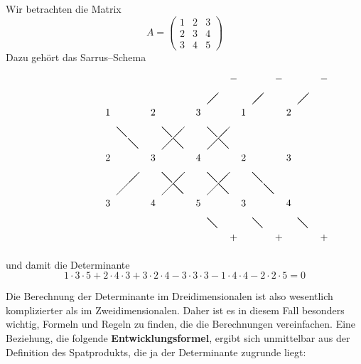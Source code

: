 \begin{beispiel}
Wir betrachten die Matrix 
  $$ A = \left( \begin{matrix} 1 & 2 & 3 \\ 2 & 3 & 4 \\ 3 & 4 & 5 \end{matrix} \right) $$
Dazu gehört das Sarrus--Schema
$$ \setlength{\unitlength}{0.4cm}
\begin{picture}(22,16)(-4,-4)
  \put(0,0){$3$}
  \put(1,1){\line(1,1){2}}
  \put(0,4){$2$}
  \put(9,9){\line(1,1){1}}
  \put(0,8){$1$}
  \put(4,0){$4$}
  \put(5,1){\line(1,1){2}}
  \put(4,4){$3$}
  \put(5,5){\line(1,1){2}}
  \put(4,8){$2$}
  \put(8,0){$5$}
  \put(9,1){\line(1,1){2}}
  \put(8,4){$4$}
  \put(9,5){\line(1,1){2}}
  \put(8,8){$3$}
  \put(12,0){$3$}
  \put(13,9){\line(1,1){1}}
  \put(12,4){$2$}
  \put(17,9){\line(1,1){1}}
  \put(12,8){$1$}
  \put(16,0){$4$}
  \put(16,4){$3$}
  \put(16,8){$2$}
  \put(11,11){$-$}
  \put(15,11){$-$}
  \put(19,11){$-$}
  \put(1,7){\line(1,-1){0.9}}
  \put(2,6){\line(1,-1){0.9}}
  \put(5,3){\line(1,-1){0.9}}
  \put(6,2){\line(1,-1){0.9}}
  \put(9,-1){\line(1,-1){0.9}}
  \put(5,7){\line(1,-1){0.9}}
  \put(6,6){\line(1,-1){0.9}}
  \put(9,3){\line(1,-1){0.9}}
  \put(10,2){\line(1,-1){0.9}}
  \put(13,-1){\line(1,-1){0.9}}
  \put(9,7){\line(1,-1){0.9}}
  \put(10,6){\line(1,-1){0.9}}
  \put(13,3){\line(1,-1){0.9}}
  \put(14,2){\line(1,-1){0.9}}
  \put(17,-1){\line(1,-1){0.9}}
  \put(11,-3){$+$}
  \put(15,-3){$+$}
  \put(19,-3){$+$}
\end{picture} 
\setlength{\unitlength}{1pt}  $$
und damit die Determinante
  	$$ 1 \cdot 3 \cdot 5 + 2 \cdot 4 \cdot 3 + 3 \cdot 2 \cdot 4 - 3 \cdot 3 \cdot 3 - 1 \cdot 4 \cdot 4
  	- 2 \cdot 2 \cdot 5 = 0 $$
\end{beispiel}

\medbreak 

Die Berechnung der Determinante im Dreidimensionalen ist also wesentlich komplizierter als im 
Zweidimensionalen. Daher ist es in diesem Fall besonders wichtig, Formeln und Regeln zu finden, die 
die Berechnungen vereinfachen. Eine Beziehung, die folgende \textbf{Entwicklungsformel}, ergibt sich 
unmittelbar aus der Definition des Spatprodukts, die ja der Determinante zugrunde liegt:

